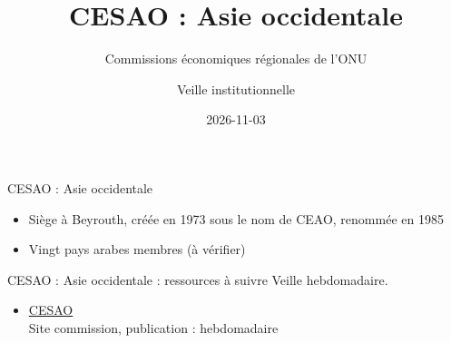 \documentclass[aspectratio=169,11pt]{beamer}
\title{CESAO : Asie occidentale}
\subtitle{Commissions économiques régionales de l'ONU}
\author{Veille institutionnelle}
\date{2026-11-03}
\begin{document}
\begin{frame}\titlepage\end{frame}

\begin{frame}{CESAO : Asie occidentale}
\begin{itemize}
\item Siège à Beyrouth, créée en 1973 sous le nom de CEAO, renommée en 1985
\item Vingt pays arabes membres (à vérifier)
\end{itemize}
\end{frame}

\begin{frame}{CESAO : Asie occidentale : ressources à suivre}
\small
Veille hebdomadaire.
\begin{itemize}
\item \href{https://www.unescwa.org}{CESAO}\\{\footnotesize Site commission, publication : hebdomadaire}
\end{itemize}
\end{frame}
\end{document}
